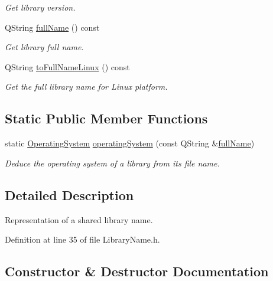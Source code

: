 \begin{DoxyCompactItemize}
\begin{DoxyCompactList}\small\item\em Get library version. \end{DoxyCompactList}\item 
Q\+String \hyperlink{class_mdt_1_1_deploy_utils_1_1_library_name_a2ca0dd90765abc0bd7082bc3f64da1c7}{full\+Name} () const 
\begin{DoxyCompactList}\small\item\em Get library full name. \end{DoxyCompactList}\item 
Q\+String \hyperlink{class_mdt_1_1_deploy_utils_1_1_library_name_a53890f4faa14e43f3b38fb9aabae88c9}{to\+Full\+Name\+Linux} () const 
\begin{DoxyCompactList}\small\item\em Get the full library name for Linux platform. \end{DoxyCompactList}\end{DoxyCompactItemize}
\subsection*{Static Public Member Functions}
\begin{DoxyCompactItemize}
\item 
static \hyperlink{namespace_mdt_1_1_deploy_utils_a998c3ae583084b7cac9e9a71b9e1ac32}{Operating\+System} \hyperlink{class_mdt_1_1_deploy_utils_1_1_library_name_ae529639b44d3af11c28deaf3dfcd5f4d}{operating\+System} (const Q\+String \&\hyperlink{class_mdt_1_1_deploy_utils_1_1_library_name_a2ca0dd90765abc0bd7082bc3f64da1c7}{full\+Name})
\begin{DoxyCompactList}\small\item\em Deduce the operating system of a library from its file name. \end{DoxyCompactList}\end{DoxyCompactItemize}


\subsection{Detailed Description}
Representation of a shared library name. 

Definition at line 35 of file Library\+Name.\+h.



\subsection{Constructor \& Destructor Documentation}
